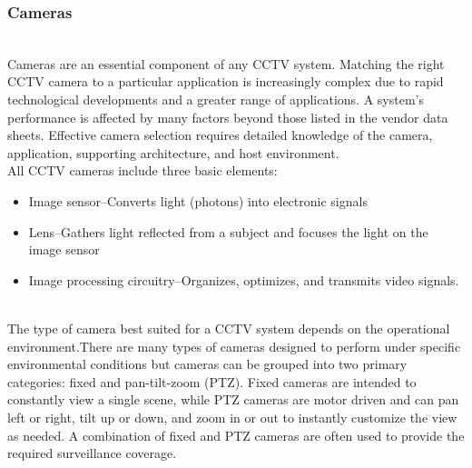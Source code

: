 \documentclass[12pt,fleqn]{book} %
\begin{document}
    \subsubsection{Cameras}
    \\Cameras are an essential component of any CCTV system. Matching the right CCTV camera to a particular application is increasingly complex due to rapid technological developments and a greater range of applications. A system’s performance is affected by many factors beyond those listed in the vendor data sheets. Effective camera selection requires detailed knowledge of the camera, application, supporting architecture, and host environment.
    \\All CCTV cameras include three basic elements:
    \begin{itemize}
        \item  Image sensor–Converts light (photons) into electronic signals
        \item Lens–Gathers light reflected from a subject and focuses the light on the image sensor
        \item Image processing circuitry–Organizes, optimizes, and transmits video signals. 
    \end{itemize}
\\The type of camera best suited for a CCTV system depends on the operational environment.There are many types of cameras designed to perform under specific environmental conditions but cameras can be grouped into two primary categories: fixed and pan-tilt-zoom (PTZ). Fixed cameras are intended to constantly view a single scene, while PTZ cameras are motor driven and can pan left or right, tilt up or down, and zoom in or out to instantly customize the view as needed. A combination of fixed and PTZ cameras are often used to provide the required surveillance coverage.
\end{document}
